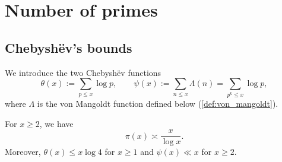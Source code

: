\section{Number of primes}

\subsection{Chebyshëv's bounds}
We introduce the two Chebyshëv functions
\begin{equation*}
    \theta(x) := \sum_{p\le x}\log p, \qquad \psi(x) := \sum_{n\le x}\Lambda(n) = \sum_{p^k\le x}\log p,
\end{equation*}
where $\Lambda$ is the von Mangoldt function defined below (\cref{def:von_mangoldt}).

\begin{theorem}\label{thm:chebyshev}
    For $x \ge 2$, we have
    \begin{equation*}
        \pi(x) \asymp \frac{x}{\log x}.
    \end{equation*}
    Moreover, $\theta(x)\le x\log 4$ for $x\ge1$ and $\psi(x)\ll x$ for $x \ge 2$.
\end{theorem}
